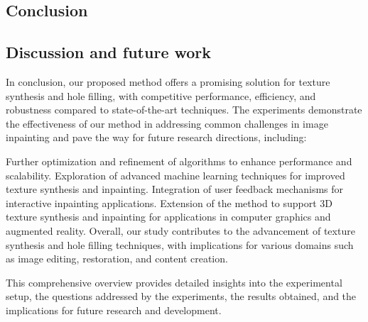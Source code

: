\begin{conclusion}
    
    
\section{Conclusion}
\subsection{Discussion and future work}

In conclusion, our proposed method offers a promising solution for texture synthesis and hole filling, with competitive performance, efficiency, and robustness compared to state-of-the-art techniques. The experiments demonstrate the effectiveness of our method in addressing common challenges in image inpainting and pave the way for future research directions, including:

Further optimization and refinement of algorithms to enhance performance and scalability. Exploration of advanced machine learning techniques for improved texture synthesis and inpainting. Integration of user feedback mechanisms for interactive inpainting applications. Extension of the method to support 3D texture synthesis and inpainting for applications in computer graphics and augmented reality. Overall, our study contributes to the advancement of texture synthesis and hole filling techniques, with implications for various domains such as image editing, restoration, and content creation.

This comprehensive overview provides detailed insights into the experimental setup, the questions addressed by the experiments, the results obtained, and the implications for future research and development.



\end{conclusion}
